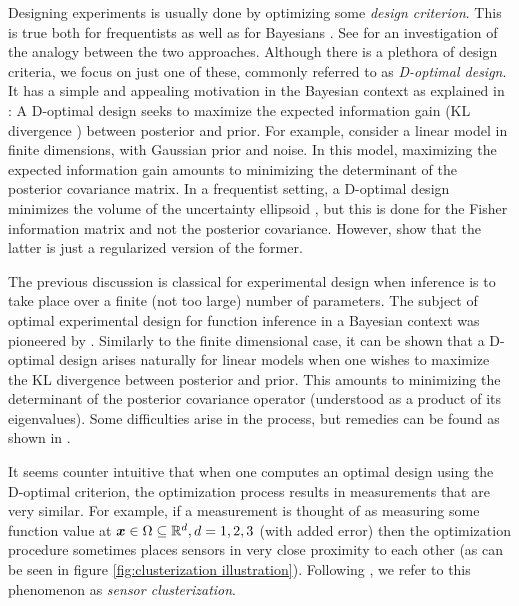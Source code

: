 \documentclass{amsart}
\numberwithin{equation}{section}
\begin{document}
Designing experiments is usually done by optimizing some \emph{design
  criterion}. This is true both for frequentists
\cite{Silvey13,Ucinski05} as well as for Bayesians
\cite{ChalonerVerdinelli95}. See \cite{ChalonerVerdinelli95} for an
investigation of the analogy between the two approaches. Although
there is a plethora of design criteria, we focus on just one of these,
commonly referred to as \emph{D-optimal design}. It has a simple and
appealing motivation in the Bayesian context as explained in
\cite{ChalonerVerdinelli95}: A D-optimal design seeks to maximize the
expected information gain (KL divergence
\cite{KullbackLeibler51,CoverThomas12}) between posterior and
prior. For example, consider a linear model in finite dimensions, with
Gaussian prior and noise. In this model, maximizing the expected
information gain amounts to minimizing the determinant of the
posterior covariance matrix. In a frequentist setting, a D-optimal
design minimizes the volume of the uncertainty ellipsoid \cite[page
  16]{Ucinski05}, but this is done for the Fisher information matrix
and not the posterior covariance. However, \cite{ChalonerVerdinelli95}
show that the latter is just a regularized version of the former.

The previous discussion is classical for experimental design when
inference is to take place over a finite (not too large) number of
parameters. The subject of optimal experimental design for function
inference in a Bayesian context was pioneered by
\cite{AlexanderianGloorGhattas14, AlexanderianPetraStadlerEtAl16,
  AlexanderianPetraStadlerEtAl14}. Similarly to the finite dimensional
case, it can be shown that a D-optimal design arises naturally for
linear models when one wishes to maximize the KL divergence between
posterior and prior. This amounts to minimizing the determinant of the
posterior covariance operator (understood as a product of its
eigenvalues). Some difficulties arise in the process, but remedies can
be found as shown in \cite{AlexanderianGloorGhattas14}.

It seems counter intuitive that when one computes an optimal design
using the D-optimal criterion, the optimization process results in
measurements that are very similar. For example, if a measurement is
thought of as measuring some function value at ${\boldsymbol{x}} \in \Omega
\subseteq \mathbb{R}^d, d=1,2,3$ (with added error) then the optimization
procedure sometimes places sensors in very close proximity to each
other (as can be seen in figure \ref{fig:clusterization
  illustration}). Following \cite{Ucinski05}, we refer to this
phenomenon as \emph{sensor clusterization}.
\end{document}
